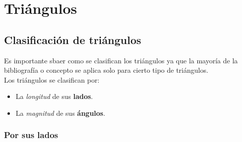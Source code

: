 \newpage
\section{Triángulos}



\subsection{Clasificación de triángulos}

Es importante sbaer como se clasifican los triángulos ya que la mayoría de la 
bibliografía o concepto se aplica solo para cierto tipo de triángulos.\\

Los triángulos se clasifican por:
\begin{itemize}
  \item La \textit{longitud} de sus \textbf{lados}.
  \item La \textit{magnitud} de sus \textbf{ángulos}.
\end{itemize}
\subsubsection{Por sus lados}

